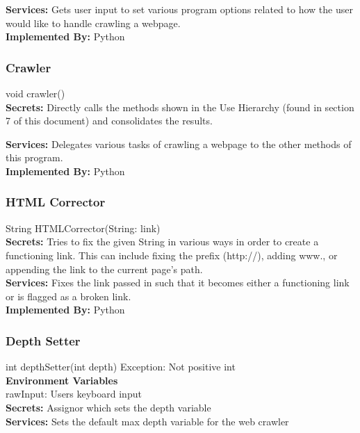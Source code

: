 \documentclass[titlepage]{article}
\begin{document}
\textbf{Services:}
Gets user input to set various program options related to how the user would like to handle crawling a webpage.\\

\textbf{Implemented By:}
Python

\subsubsection{Crawler}
void crawler()\\

\textbf{Secrets:}
Directly calls the methods shown in the Use Hierarchy (found in section 7 of this document) and consolidates the results.

\textbf{Services:}
Delegates various tasks of crawling a webpage to the other methods of this program.\\

\textbf{Implemented By:}
Python

\subsubsection{HTML Corrector}
String HTMLCorrector(String: link)\\

\textbf{Secrets:}
Tries to fix the given String in various ways in order to create a functioning link. This can include fixing the prefix (http://), adding www., or appending the link to the current page's path.\\

\textbf{Services:}
Fixes the link passed in such that it becomes either a functioning link or is flagged as a broken link.\\

\textbf{Implemented By:}
Python

\subsubsection{Depth Setter}
int depthSetter(int depth) Exception: Not positive int\\

\textbf{Environment Variables}\\
rawInput: Users keyboard input\\

\textbf{Secrets:}
Assignor which sets the depth variable\\

\textbf{Services:}
Sets the default max depth variable for the web crawler\\
\end{document}
